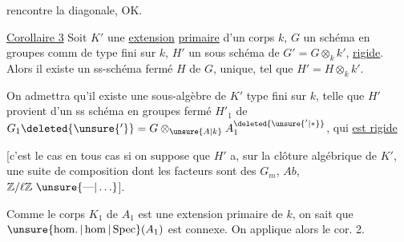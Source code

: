 rencontre la diagonale, OK.

\uline{Corollaire 3} Soit $K'$ une \uline{extension} \uline{primaire} d'un corps $k$, $G$ un schéma en groupes comm de type fini sur $k$, $H'$ un sous schéma  de $G'=G\otimes_k k'$, \uline{rigide}. Alors il existe un ss-schéma  fermé $H$ de $G$, unique,  tel que $H'=H\otimes_k k'$.

On admettra qu'il existe une sous-algèbre  de $K'$  type fini sur $k$, telle que $H'$ provient d'un ss schéma en groupes fermé $H'_1$ de $G_1\deleted{\unsure{'}}=G\otimes_{\unsure{A|k}}A_1^{\deleted{\unsure{'|*}}}$,  qui \uline{est rigide}

[c'est le cas en tous cas si on  suppose que $H'$ a, sur la clôture algébrique de $K'$, une suite de composition dont les facteurs sont des $G_m$, $Ab$, $\mathbb Z/\ell\mathbb Z\ \unsure{\text{---}|\ldots}$].

 Comme le corps $K_1$ de $A_1$ est une extension primaire de $k$, on sait que $\unsure{\operatorname{hom.}|\operatorname{hom}|\operatorname{Spec}}(A_1)$ est  connexe. On applique alors le cor. 2.
